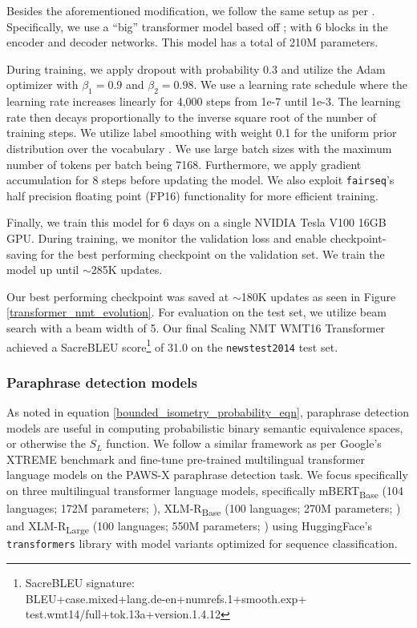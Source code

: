 \documentclass[11pt,a4paper]{article}
\begin{document}
Besides the aforementioned modification, we follow the same setup as per \citet{ott2018scaling}. Specifically, we use a ``big'' transformer model based off \citet{vaswani2017attention}; with 6 blocks in the encoder and decoder networks. This model has a total of 210M parameters.

During training, we apply dropout \cite{srivastava2014dropout} with probability 0.3 and utilize the Adam optimizer \cite{kingma2014adam} with $\beta_1 = 0.9$ and $\beta_2=0.98$. We use a learning rate schedule where the learning rate increases linearly for 4,000 steps from 1e-7 until 1e-3. The learning rate then decays proportionally to the inverse square root of the number of training steps. We utilize label smoothing with weight 0.1 for the uniform prior distribution over the vocabulary \cite{pereyra2017regularizing}. We use large batch sizes with the maximum number of tokens per batch being 7168. Furthermore, we apply gradient accumulation for 8 steps before updating the model. We also exploit \texttt{fairseq}'s half precision floating point (FP16) functionality for more efficient training.

Finally, we train this model for 6 days on a single NVIDIA Tesla V100 16GB GPU. During training, we monitor the validation loss and enable checkpoint-saving for the best performing checkpoint on the validation set. We train the model up until $\sim$285K updates.

Our best performing checkpoint was saved at $\sim$180K updates as seen in Figure \ref{transformer_nmt_evolution}. For evaluation on the test set, we utilize beam search with a beam width of 5. Our final Scaling NMT WMT16 Transformer achieved a SacreBLEU \cite{post-2018-call} score\footnote{\footnotesize SacreBLEU signature:\\BLEU+case.mixed+lang.de\nobreakdash-en+numrefs.1+smooth.exp+\\test.wmt14/full+tok.13a+version.1.4.12} of 31.0 on the \texttt{newstest2014} test set.

\subsubsection{Paraphrase detection models}

As noted in equation \ref{bounded_isometry_probability_eqn}, paraphrase detection models are useful in computing probabilistic binary semantic equivalence spaces, or otherwise the $S_L$ function. We follow a similar framework as per Google's XTREME benchmark \cite{hu2020xtreme} and fine-tune pre-trained multilingual transformer language models on the PAWS-X paraphrase detection task. We focus specifically on three multilingual transformer language models, specifically mBERT\textsubscript{Base} (104 languages; 172M parameters; \citealt{devlin-etal-2019-bert}), XLM-R\textsubscript{Base} (100 languages; 270M parameters; \citealt{conneau2019unsupervised}) and XLM-R\textsubscript{Large} (100 languages; 550M parameters; \citealt{conneau2019unsupervised}) using HuggingFace's \texttt{transformers} library \cite{Wolf2019HuggingFacesTS} with model variants optimized for sequence classification.
\end{document}
